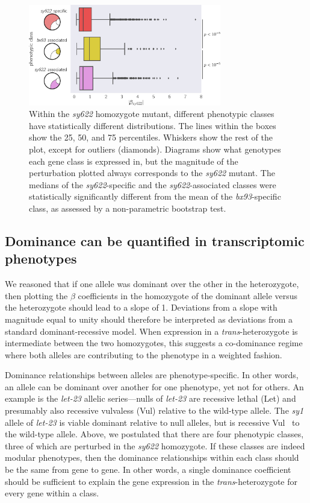 \documentclass[10pt, twocolumn]{article}
\newcommand{\gene}[1]{\mbox{\emph{#1}}}
\begin{document}
\begin{figure}
  \centering{}
  \includegraphics[width=0.75\textwidth]{../figs/dpy22_classes.pdf}
  \caption{
    Within the \emph{sy622} homozygote mutant, different phenotypic classes have
    statistically different distributions. The lines
    within the boxes show the 25, 50, and 75 percentiles. Whiskers show the rest
    of the plot, except for outliers (diamonds). Diagrams show what genotypes each
    gene class is expressed in, but the magnitude of the perturbation plotted
    always corresponds to the \emph{sy622} mutant.
    The medians of the \emph{sy622}-specific and the \emph{sy622}-associated
    classes were statistically significantly different from the mean of the
    \emph{bx93}-specific class, as assessed by a non-parametric bootstrap test.
  }
\label{fig:classes}
\end{figure}

\subsection*{Dominance can be quantified in transcriptomic phenotypes}
We reasoned that if one allele was dominant over the other in the heterozygote,
then plotting the $\beta$ coefficients in the homozygote of the dominant allele
versus the heterozygote should lead to a slope of 1. Deviations from a slope
with magnitude equal to unity should therefore be interpreted as deviations from
a standard dominant-recessive model. When expression in a \emph{trans}-heterozygote
is intermediate between the two homozygotes, this suggests a co-dominance regime
where both alleles are contributing to the phenotype in a weighted fashion.

Dominance relationships between alleles are phenotype-specific. In other
words, an allele can be dominant over another for one phenotype, yet not for
others. An example is the \gene{let-23} allelic series---nulls of
\gene{let-23} are recessive lethal (Let) and presumably also recessive vulvaless
(Vul) relative to the wild-type allele. The \emph{sy1} allele of
\gene{let-23} is viable dominant relative to null alleles, but is recessive
Vul~\cite{} to the wild-type allele. Above, we postulated that there are four
phenotypic classes, three of which are perturbed in the \emph{sy622} homozygote.
If these classes are indeed modular phenotypes, then the dominance relationships
within each class should be the same from gene to gene. In other words, a single
dominance coefficient should be sufficient to explain the gene expression in the
\emph{trans}-heterozygote for every gene within a class.
\end{document}
